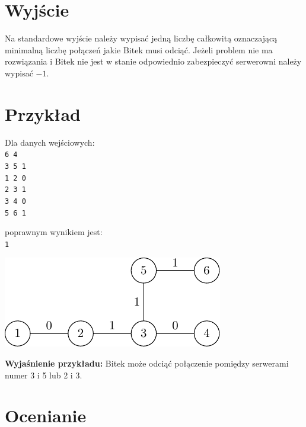 \documentclass[10pt]{article}
\begin{document}

    \section*{Wyjście}
    
    Na standardowe wyjście należy wypisać jedną liczbę całkowitą oznaczającą minimalną liczbę połączeń jakie Bitek musi odciąć. Jeżeli problem nie ma rozwiązania i Bitek nie jest w stanie odpowiednio zabezpieczyć serwerowni należy wypisać $-1$.


    \section*{Przykład}
    
    \noindent
    \begin{minipage}[t]{0.5\textwidth}
        Dla danych wejściowych:\vspace{1ex}\\
        \texttt{6 4\\3 5 1\\1 2 0\\2 3 1\\3 4 0\\5 6 1}
    \end{minipage}
    \begin{minipage}[t]{0.5\textwidth}
        poprawnym wynikiem jest:\vspace{1ex}\\
        \texttt{1}
    \end{minipage}
    
    \vspace{-10ex}
    \begin{center}
        \includegraphics{wirrys-1.pdf}
    \end{center}
    \noindent\textbf{Wyjaśnienie przykładu:} Bitek może odciąć połączenie pomiędzy serwerami numer 3 i 5 lub 2 i 3.
    

    \section*{Ocenianie}
        
\end{document}
